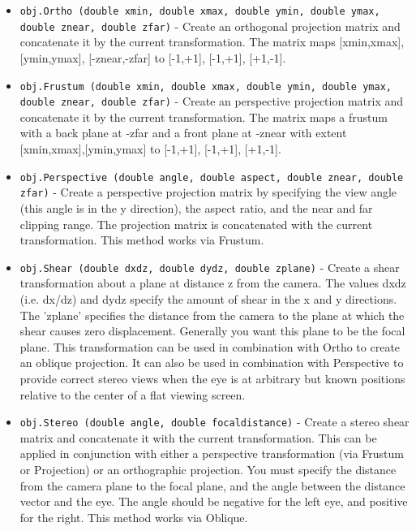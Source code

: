 \begin{itemize}
\item  \verb|obj.Ortho (double xmin, double xmax, double ymin, double ymax, double znear, double zfar)| -  Create an orthogonal projection matrix and concatenate it by the
 current transformation.  The matrix maps [xmin,xmax], [ymin,ymax], 
 [-znear,-zfar] to [-1,+1], [-1,+1], [+1,-1]. 

\item  \verb|obj.Frustum (double xmin, double xmax, double ymin, double ymax, double znear, double zfar)| -  Create an perspective projection matrix and concatenate it by the
 current transformation.  The matrix maps a frustum with a back
 plane at -zfar and a front plane at -znear with extent 
 [xmin,xmax],[ymin,ymax] to [-1,+1], [-1,+1], [+1,-1].

\item  \verb|obj.Perspective (double angle, double aspect, double znear, double zfar)| -  Create a perspective projection matrix by specifying the view angle
 (this angle is in the y direction), the aspect ratio, and the near 
 and far clipping range.  The projection matrix is concatenated 
 with the current transformation.  This method works via Frustum.

\item  \verb|obj.Shear (double dxdz, double dydz, double zplane)| -  Create a shear transformation about a plane at distance z from
 the camera.  The values dxdz (i.e. dx/dz) and dydz specify the
 amount of shear in the x and y directions.  The 'zplane' specifies
 the distance from the camera to the plane at which the shear
 causes zero displacement.  Generally you want this plane to be the
 focal plane.
 This transformation can be used in combination with Ortho to create 
 an oblique projection.  It can also be used in combination with
 Perspective to provide correct stereo views when the eye is at
 arbitrary but known positions relative to the center of a flat
 viewing screen.

\item  \verb|obj.Stereo (double angle, double focaldistance)| -  Create a stereo shear matrix and concatenate it with the
 current transformation.  This can be applied in conjunction with either a 
 perspective transformation (via Frustum or Projection) or an
 orthographic projection.  You must specify the distance from
 the camera plane to the focal plane, and the angle between
 the distance vector and the eye.  The angle should be negative
 for the left eye, and positive for the right.  This method
 works via Oblique.


\end{itemize}
